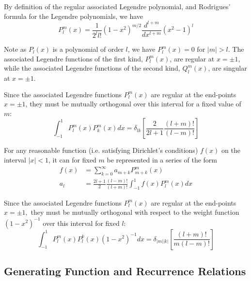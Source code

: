 \documentclass[12pt, a4paper, oneside, openright, titlepage]{book}
\begin{document}
\begin{prop}
    By definition of the regular associated Legendre polynomial, and Rodrigues' formula for the Legendre polynomials, we have \begin{equation}
        P_l^m(x) = \frac{1}{2^ll!}(1-x^2)^{m/2}\frac{d^{l+m}}{dx^{l+m}}(x^2-1)^l
    \end{equation}
\end{prop}

Note as $P_l(x)$ is a polynomial of order $l$, we have $P_l^m(x) = 0$ for $|m| > l$. The associated Legendre functions of the first kind, $P_l^m(x)$, are regular at $x = \pm 1$, while the associated Legendre functions of the second kind, $Q_l^m(x)$, are singular at $x = \pm 1$.

\begin{thm}
    Since the associated Legendre functions $P_l^m(x)$ are regular at the end-points $x = \pm 1$, they must be mutually orthogonal over this interval for a fixed value of $m$: \begin{equation*}
        \int_{-1}^1P_l^m(x)P_k^m(x)dx = \delta_{lk}\left[\frac{2}{2l+1}\frac{(l+m)!}{(l-m)!}\right]
    \end{equation*}
\end{thm}

For any reasonable function (i.e. satisfying Dirichlet's conditions) $f(x)$ on the interval $|x| < 1$, it can for fixed $m$ be represented in a series of the form \begin{align*}
    f(x) &= \sum_{k=0}^{\infty}a_{m+k}P_{m+k}^m(x) \\
    a_l &= \frac{2l+1}{2}\frac{(l-m)!}{(l+m)!}\int_{-1}^1f(x)P_l^m(x)dx
\end{align*}

\begin{thm}
    Since the associated Legendre functions $P_l^m(x)$ are regular at the end-points $x = \pm 1,$ they must be mutually orthogonal with respect to the weight function $(1-x^2)^{-1}$ over this interval for fixed $l$: \begin{equation}
        \int_{-1}^1P_l^m(x)P_l^k(x)(1-x^2)^{-1}dx = \delta_{|m||k|}\left[\frac{(l+m)!}{m(l-m)!}\right]
    \end{equation}
\end{thm}


\subsection{Generating Function and Recurrence Relations}
\end{document}
